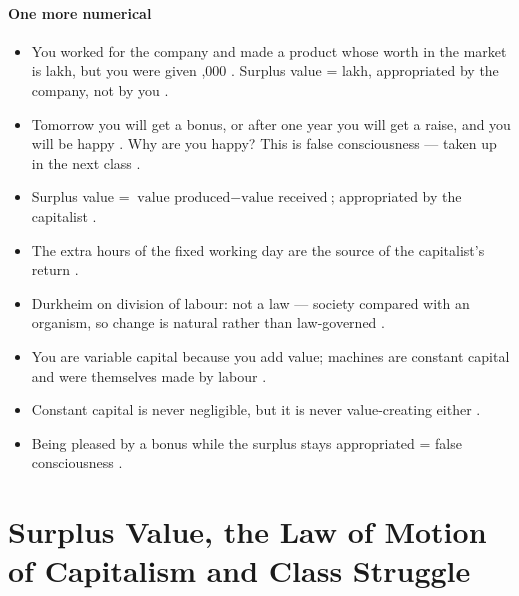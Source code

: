 \paragraph{One more numerical}
\begin{itemize}
    \item You worked for the company and made a product whose worth in the market is  lakh, but you were given ,000 . Surplus value =  lakh, appropriated by the company, not by you .
    \item Tomorrow you will get a bonus, or after one year you will get a raise, and you will be happy . Why are you happy? This is false consciousness --- taken up in the next class .
\end{itemize}

\begin{QuickRevision}
\begin{itemize}
    \item Surplus value = $\text{value produced} - \text{value received}$; appropriated by the capitalist .
    \item The extra hours of the fixed working day are the source of the capitalist's return .
    \item Durkheim on division of labour: not a law --- society compared with an organism, so change is natural rather than law-governed .
    \item You are variable capital because you add value; machines are constant capital and were themselves made by labour .
    \item Constant capital is never negligible, but it is never value-creating either .
    \item Being pleased by a bonus while the surplus stays appropriated = false consciousness .
\end{itemize}
\end{QuickRevision}

\sectiondivider

\section{Surplus Value, the Law of Motion of Capitalism and Class Struggle}

